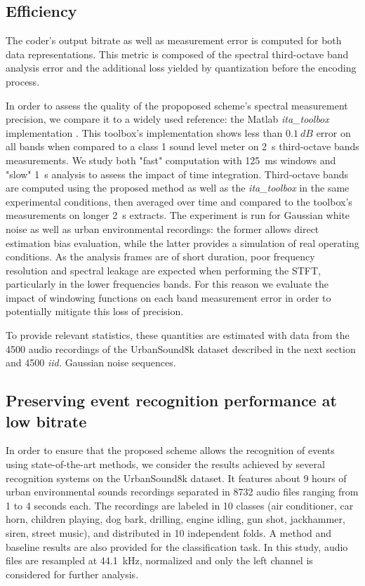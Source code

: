\documentclass[sensors,article,submit,moreauthors,pdftex,10pt,a4paper]{mdpi}
\begin{document}
\subsection{Efficiency} \label{sec:efficiency_p}

The coder's output bitrate as well as measurement error is computed for both data representations. This metric is composed of the spectral third-octave band analysis error and the additional loss yielded by quantization before the encoding process.

In order to assess the quality of the propoposed scheme's spectral measurement precision, we compare it to a widely used reference: the Matlab \textit{ita\_toolbox} implementation \cite{itatoolbox2017}. This toolbox's implementation shows less than $0.1~dB$ error on all bands when compared to a class 1 sound level meter on 2~s third-octave bands measurements. We study both "fast" computation with 125~ms windows and "slow" 1~s analysis to assess the impact of time integration. Third-octave bands are computed using the proposed method as well as the \textit{ita\_toolbox} in the same experimental conditions, then averaged over time and compared to the toolbox's measurements on longer 2~s extracts. The experiment is run for Gaussian white noise as well as urban environmental recordings: the former allows direct estimation bias evaluation, while the latter provides a simulation of real operating conditions. As the analysis frames are of short duration, poor frequency resolution and spectral leakage are expected when performing the STFT, particularly in the lower frequencies bands. For this reason we evaluate the impact of windowing functions on each band measurement error in order to potentially mitigate this loss of precision. 

To provide relevant statistics, these quantities are estimated with data from the 4500 audio recordings of the UrbanSound8k dataset \cite{salamon2014} described in the next section and 4500 \textit{iid.} Gaussian noise sequences.

\subsection{Preserving event recognition performance at low bitrate} \label{sec:event_p}

In order to ensure that the proposed scheme allows the recognition of events using state-of-the-art methods, we consider the results achieved by several recognition systems on the UrbanSound8k dataset\cite{salamon2014}. It features about 9 hours of urban environmental sounds recordings separated in 8732 audio files ranging from 1 to 4 seconds each. The recordings are labeled in 10 classes (air conditioner, car horn, children playing, dog bark, drilling, engine idling, gun shot, jackhammer, siren, street music), and distributed in 10 independent folds. A method and baseline results are also provided for the classification task. In this study, audio files are resampled at 44.1~kHz, normalized and only the left channel is considered for further analysis.
\end{document}
